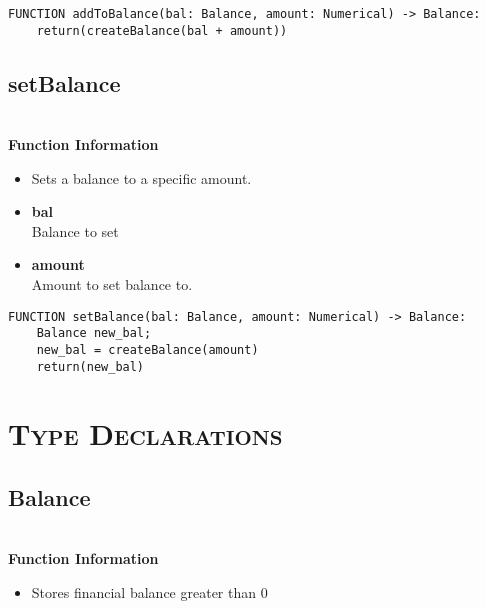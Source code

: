 \begin{verbatim}
FUNCTION addToBalance(bal: Balance, amount: Numerical) -> Balance:
	return(createBalance(bal + amount))
\end{verbatim}

\clearpage

\subsection{setBalance}
\textbf{ \\ Function Information}
\begin{itemize}
	\setlength{\itemsep}{5pt}
	\setlength{\parskip}{0pt}
	\setlength{\parsep}{0pt}
	\item Sets a balance to a specific amount.
	\item \textbf{bal} \\ Balance to set
	\item \textbf{amount} \\ Amount to set balance to.
\end{itemize}

\begin{verbatim}
FUNCTION setBalance(bal: Balance, amount: Numerical) -> Balance:
	Balance new_bal;
	new_bal = createBalance(amount)
	return(new_bal)
\end{verbatim}


\section{\textsc{Type Declarations}}

\subsection{Balance}
\textbf{ \\ Function Information}
\begin{itemize}
	\setlength{\itemsep}{5pt}
	\setlength{\parskip}{0pt}
	\setlength{\parsep}{0pt}
	\item Stores financial balance greater than 0
\end{itemize}

